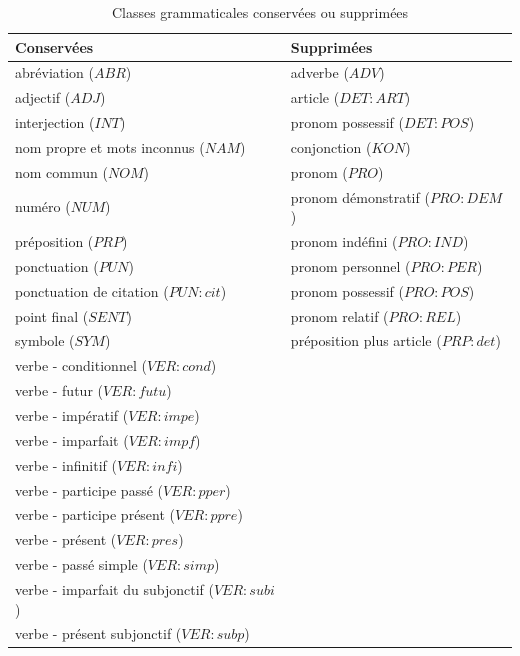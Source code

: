 \begin{table}[ht]
\centering
\begin{tabular}{| l | l |}
\hline
\textbf{Conservées} 				& \textbf{Supprimées} \\
\hline
abréviation ($ABR$) 					& adverbe ($ADV$) \\ \hline
adjectif ($ADJ$)  						& article ($DET{:}ART$) \\ \hline
interjection ($INT$) 					& pronom possessif ($DET{:}POS$) \\ \hline
nom propre et mots inconnus ($NAM$) 	& conjonction ($KON$) \\ \hline
nom commun ($NOM$)						& pronom ($PRO$) \\ \hline
numéro ($NUM$)							& pronom démonstratif ($PRO{:}DEM$) \\ \hline
préposition ($PRP$)						& pronom indéfini ($PRO{:}IND$) \\ \hline
ponctuation ($PUN$)						& pronom personnel ($PRO{:}PER$) \\ \hline
ponctuation de citation ($PUN{:}cit$)	& pronom possessif ($PRO{:}POS$) \\ \hline
point final ($SENT$)					& pronom relatif ($PRO{:}REL$) \\ \hline
symbole ($SYM$)							& préposition plus article ($PRP{:}det$) \\ \hline
verbe - conditionnel ($VER{:}cond$)		& \\ \hline
verbe - futur ($VER{:}futu$)			& \\ \hline
verbe - impératif ($VER{:}impe$)		& \\ \hline
verbe - imparfait ($VER{:}impf$)		& \\ \hline
verbe - infinitif ($VER{:}infi$)		& \\ \hline
verbe - participe passé ($VER{:}pper$)	& \\ \hline
verbe - participe présent ($VER{:}ppre$)		& \\ \hline
verbe - présent ($VER{:}pres$)					& \\ \hline
verbe - passé simple ($VER{:}simp$)				& \\ \hline
verbe - imparfait du subjonctif ($VER{:}subi$)	& \\ \hline
verbe - présent subjonctif ($VER{:}subp$)		& \\ \hline
\end{tabular}
\caption{Classes grammaticales conservées ou supprimées}
\label{table:3-I-3-NettoyageDonnees-Classesgrammaticales}
\end{table}




